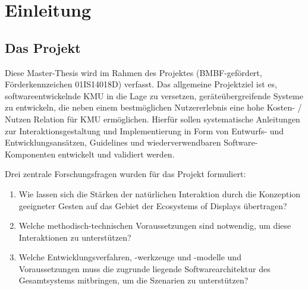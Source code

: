 




\frontmatter

\setcounter{page}{0}
\renewcommand{\rmdefault}{ptm}



\tableofcontents

\cleardoublepage
{}
\setcounter{frontmatterpage}{\value{page}}

\mainmatter

\onehalfspacing


\chapter{Einleitung}
\label{ch:einleitung}
\section{Das Projekt \sysplace}
\label{sec:sysplace}
Diese Master-Thesis wird im Rahmen des Projektes \sysplace (BMBF-gefördert, Förderkennzeichen 01IS14018D) verfasst. Das allgemeine Projektziel ist es, softwareentwickelnde \ac{KMU} in die Lage zu versetzen,
geräteübergreifende Systeme zu entwickeln, die neben einem bestmöglichen Nutzererlebnis eine hohe Kosten- / Nutzen Relation für \ac{KMU} ermöglichen. Hierfür sollen systematische Anleitungen zur Interaktionsgestaltung und Implementierung in Form von Entwurfs- und Entwicklungsansätzen, Guidelines und wiederverwendbaren Software-Komponenten entwickelt und validiert werden.

Drei zentrale Forschungsfragen wurden für das Projekt formuliert:
\begin{enumerate}
\item Wie lassen sich die Stärken der natürlichen Interaktion durch die Konzeption geeigneter Gesten auf das Gebiet der Ecosystems of Displays übertragen?
\item Welche methodisch-technischen Voraussetzungen sind notwendig, um diese Interaktionen zu unterstützen?
\item Welche Entwicklungsverfahren, -werkzeuge und -modelle und Voraussetzungen
muss die zugrunde liegende Softwarearchitektur des Gesamtsystems mitbringen, um
die Szenarien zu unterstützen?
\end{enumerate}


